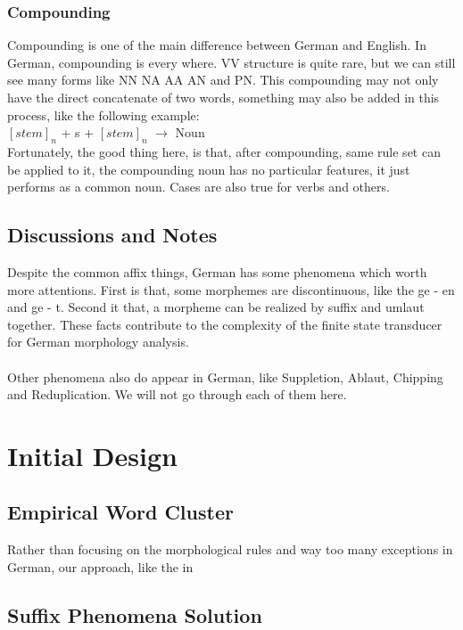 \documentclass[11pt,letterpaper]{article}
\begin{document}
\subsubsection{Compounding}
Compounding is one of the main difference between German and English. In German, compounding is every where. VV structure is quite rare, but we can still see many forms like NN NA AA AN and PN. This compounding may not only have the direct concatenate of two words, something may also be added in this process, like the following example:\\
$[stem]_n$ + s + $[stem]_n$ $\rightarrow$ Noun\\
Fortunately, the good thing here, is that, after compounding, same rule set can be applied to it, the compounding noun has no particular features, it just performs as a common noun. Cases are also true for verbs and others.

\subsection{Discussions and Notes}
Despite the common affix things, German has some phenomena which worth more attentions. First is that, some morphemes are discontinuous, like the ge - en and ge - t. Second it that, a morpheme can be realized by suffix and umlaut together. These facts contribute to the complexity of the finite state transducer for German morphology analysis.\\\\
Other phenomena also do appear in German, like Suppletion, Ablaut, Chipping and Reduplication. We will not go through each of them here.

\section{Initial Design}

\subsection{Empirical Word Cluster}
Rather than focusing on the morphological rules and way too many exceptions in German, our approach, like the in \cite{sch04} 
\subsection{Suffix Phenomena Solution}
\end{document}
